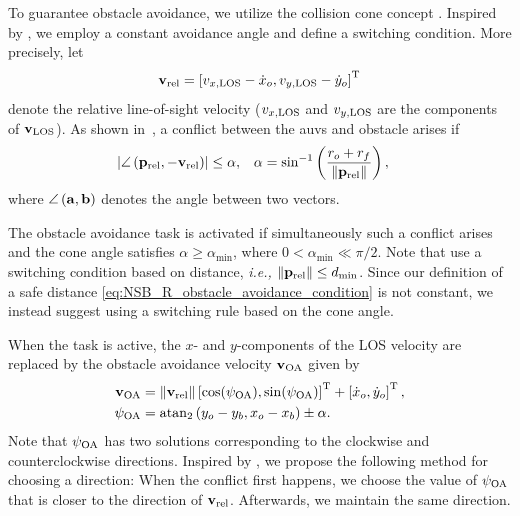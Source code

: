 To guarantee obstacle avoidance, we utilize the collision cone concept \cite{chakravarthy_obstacle_1998}. 
Inspired by \cite{wiig_collision_2019}, we employ a constant avoidance angle and define a switching condition.
More precisely, let 
\begin{equation}
    \mathbf{v}_{\rm rel} = \left[v_{x, {\rm LOS}} - \dot{x}_o, v_{y, {\rm LOS}} - \dot{y}_o\right]^{\mathrm{T}}
\end{equation}
denote the relative line-of-sight velocity ($v_{x, {\rm LOS}}$ and $v_{y, {\rm LOS}}$ are the components of $\mathbf{v}_{\rm LOS}$).
As shown in~, a conflict between the \glspl{auv} and obstacle arises if 
\begin{align}
    \left|\angle\left(\mathbf{p}_{\rm rel}, -\mathbf{v}_{\rm rel}\right)\right| &\leq \alpha, &
    \alpha &= \sin^{-1}\left(\frac{r_o+r_f}{\left\|\mathbf{p}_{\rm rel}\right\|}\right),
    \label{eq:NSB_R_collision-conflict}
\end{align}
where $\angle\left(\mathbf{a}, \mathbf{b}\right)$ denotes the angle between two vectors.


The obstacle avoidance task is activated if simultaneously such a conflict arises and the cone angle satisfies 
$\alpha \geq \alpha_{\min}$, where $0 < \alpha_{\min} \ll \pi / 2$.
Note that \cite{wiig_collision_2019} use a switching condition based on distance, \emph{i.e.,}
$\left\|\mathbf{p}_{\rm rel}\right\| \leq d_{\min}$.
Since our definition of a safe distance \eqref{eq:NSB_R_obstacle_avoidance_condition} is not constant, we instead suggest using a switching rule based on the cone angle.



When the task is active, the $x$- and $y$-components of the LOS velocity are replaced by the obstacle avoidance velocity $\mathbf{v}_{\rm OA}$ given by 
\begin{align}
    \mathbf{v}_{\rm OA} &= \left\|\mathbf{v}_{\rm rel}\right\| \left[\cos(\psi_{\rm OA}), \sin(\psi_{\rm OA})\right]^{\mathrm{T}} + \left[\dot{x}_o, \dot{y}_o\right]^{\mathrm{T}}, \\
    \psi_{\rm OA} &= {\rm atan}_2 \left(y_o - y_b, x_o - x_b\right) \pm \alpha.
\end{align}
Note that $\psi_{\rm OA}$ has two solutions corresponding to the clockwise and counterclockwise directions.
Inspired by \cite{haraldsen_reactive_2021}, we propose the following method for choosing a direction:
When the conflict first happens, we choose the value of $\psi_{\rm OA}$ that is closer to the direction of $\mathbf{v}_{\rm rel}$.
Afterwards, we maintain the same direction.



